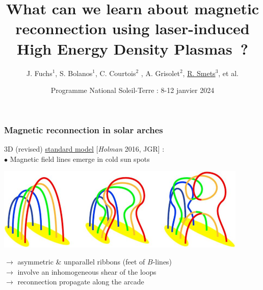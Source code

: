\documentclass{beamer}
\title{What can we learn about magnetic reconnection using laser-induced High Energy Density Plasmas~?}
\author{J. Fuchs$^1$, S. Bolanos$^1$, C. Courtois$^2$ , A. Grisolet$^2$, \underline{R. Smets}$^3$, et al.}
\institute{$^1$LULI, $^2$CEA, $^3$LPP...}
\date{Programme National Soleil-Terre : 8-12 janvier 2024}
\begin{document}
\frame{\titlepage}



\begin{frame}
\frametitle{Magnetic reconnection in solar arches}

3D (revised) \underline{standard model} [\textit{Holman} 2016, JGR] : \\[0.4cm]
$\bullet$ Magnetic field lines emerge in cold sun spots

\begin{center}
\includegraphics[width=0.9\textwidth]{standard_model.jpg}
\end{center}

$\to$ asymmetric \& unparallel ribbons (feet of $B$-lines) \\
$\to$ involve an inhomogeneous shear of the loops \\
$\to$ reconnection propagate along the arcade \\

\end{frame}
\end{document}
